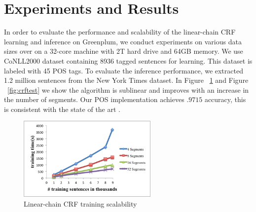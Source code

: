 \documentclass[11pt,letterpaper]{article}
\begin{document}




\section{Experiments and Results}
In order to evaluate the performance and scalability of the linear-chain CRF learning and inference on Greenplum,
we conduct experiments on various data sizes over on a 32-core machine with 2T hard drive and 64GB memory.
We use CoNLL2000 dataset containing 8936 tagged sentences for learning. 
This dataset is labeled with 45 POS tags.
To evaluate the inference performance, we extracted 1.2 million sentences from the New York Times dataset. 
In Figure ~\ref{fig:crftrain} and Figure ~\ref{fig:crftest} we show the algorithm is sublinear and improves with an increase in the number of segments.
Our POS implementation achieves $.9715$ accuracy, this is consistent with the state of the art \cite{Manning:2011:PT9:1964799.1964816}.

\begin{figure}
\centering
\includegraphics[height=11em]{training}
\caption{Linear-chain CRF training scalability}
\label{fig:crftrain}
\end{figure}
\end{document}
